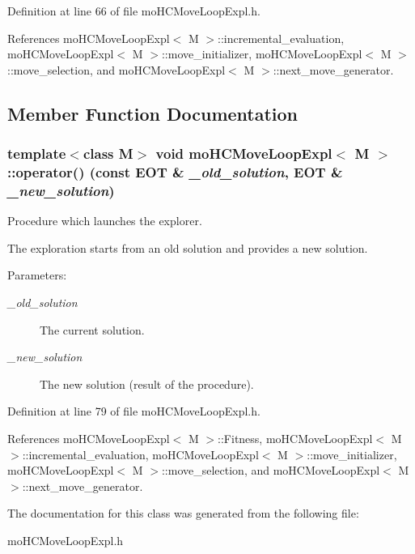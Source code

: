Definition at line 66 of file mo\-HCMove\-Loop\-Expl.h.

References mo\-HCMove\-Loop\-Expl$<$ M $>$::incremental\_\-evaluation, mo\-HCMove\-Loop\-Expl$<$ M $>$::move\_\-initializer, mo\-HCMove\-Loop\-Expl$<$ M $>$::move\_\-selection, and mo\-HCMove\-Loop\-Expl$<$ M $>$::next\_\-move\_\-generator.

\subsection{Member Function Documentation}
\subsubsection{\setlength{\rightskip}{0pt plus 5cm}template$<$class M$>$ void {\bf mo\-HCMove\-Loop\-Expl}$<$ M $>$::operator() (const {\bf EOT} \& {\em \_\-old\_\-solution}, {\bf EOT} \& {\em \_\-new\_\-solution})\hspace{0.3cm}{\tt  [inline]}}\label{classmo_h_c_move_loop_expl_a1}


Procedure which launches the explorer. 

The exploration starts from an old solution and provides a new solution.

\begin{Desc}
\item[Parameters:]
\begin{description}
\item[{\em \_\-old\_\-solution}]The current solution. \item[{\em \_\-new\_\-solution}]The new solution (result of the procedure). \end{description}
\end{Desc}


Definition at line 79 of file mo\-HCMove\-Loop\-Expl.h.

References mo\-HCMove\-Loop\-Expl$<$ M $>$::Fitness, mo\-HCMove\-Loop\-Expl$<$ M $>$::incremental\_\-evaluation, mo\-HCMove\-Loop\-Expl$<$ M $>$::move\_\-initializer, mo\-HCMove\-Loop\-Expl$<$ M $>$::move\_\-selection, and mo\-HCMove\-Loop\-Expl$<$ M $>$::next\_\-move\_\-generator.

The documentation for this class was generated from the following file:\begin{CompactItemize}
\item 
mo\-HCMove\-Loop\-Expl.h\end{CompactItemize}
